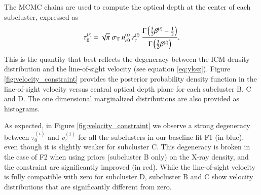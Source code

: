 \documentclass[twocolumn,traditabstract]{aa}
\begin{document}
The MCMC chains are used to compute the optical depth at the center of each subcluster, expressed as
\begin{equation}
\tau_0^{(i)} =  \sqrt{\pi} \ \sigma_{\rm T} \ n_{e0}^{(i)} \ r_c^{(i)} \ \frac{\Gamma\left(\frac{3}{2} \beta^{(i)} -\frac{1}{2}\right)}{\Gamma\left(\frac{3}{2} \beta^{(i)}\right)}.
\label{eq:tau0}
\end{equation}
This is the quantity that best reflects the degeneracy between the ICM density distribution and the line-of-sight velocity (see equation \ref{eq:yksz}). Figure \ref{fig:velocity_constraint} provides the posterior probability density function in the line-of-sight velocity versus central optical depth plane for each subcluster B, C and D. The one dimensional marginalized distributions are also provided as histograms. 

As expected, in Figure  \ref{fig:velocity_constraint} we observe a strong degeneracy between $\tau_0^{(i)}$ and $v_z^{(i)}$ for all the subclusters in our baseline fit F1 (in blue), even though it is slightly weaker for subcluster C. This degeneracy is broken in the case of F2 when using priors (subcluster B only) on the X-ray density, and the constraint are significantly improved (in red). While the line-of-sight velocity is fully compatible with zero for subcluster D, subcluster B and C show velocity distributions that are significantly different from zero.
\end{document}
